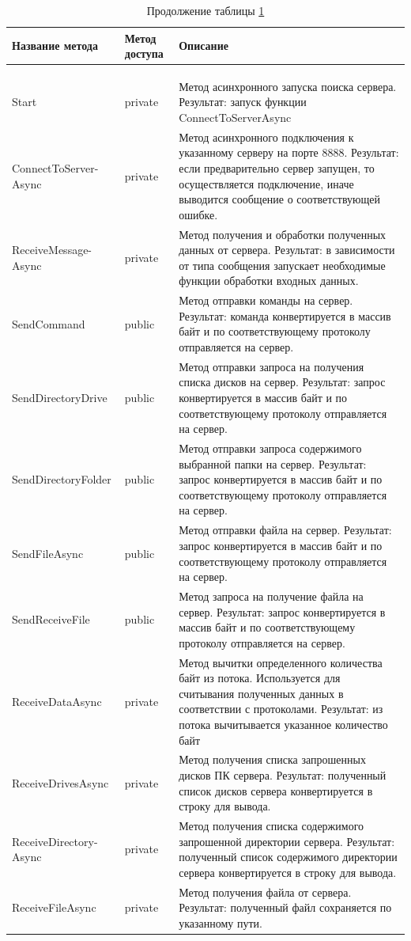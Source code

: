\begin{longtable}[l]{|p{4.25cm}|p{2.35cm}|p{8.1cm}|}
	\caption{Описание методов класса TcpSocket\label{class:tableTcp}}\\
	\hline \centrow Название метода & \centrow Метод
	доступа & \centrow Описание \\
	\hline \centrow 1 & \centrow 2 & \centrow 3\\
	\endfirsthead
	\caption*{Продолжение таблицы \ref{class:tableTcp}}\\
	\hline \centrow 1 & \centrow 2 & \centrow 3\\
	\finishhead
	\hline Start & private & Метод асинхронного запуска поиска сервера.
	Результат: запуск функции  ConnectToServerAsync \\
	\hline ConnectToServer-
	Async & private & Метод асинхронного подключения к указанному серверу на порте 8888.
	Результат: если предварительно сервер запущен, то осуществляется подключение, иначе выводится сообщение о соответствующей ошибке.\\
	\hline ReceiveMessage-
	Async & private & Метод получения и обработки полученных данных от сервера.
	Результат: в зависимости от типа сообщения запускает необходимые функции обработки входных данных.\\
	\hline SendCommand & public & Метод отправки команды на сервер.
	Результат: команда конвертируется в массив байт и по соответствующему протоколу отправляется на сервер.\\
	\hline SendDirectoryDrive & public & Метод отправки запроса на получения списка дисков на сервер.
	Результат: запрос конвертируется в массив байт и по соответствующему протоколу отправляется на сервер.\\
	\hline SendDirectoryFolder & public & Метод отправки запроса содержимого выбранной папки на сервер.
	Результат: запрос конвертируется в массив байт и по соответствующему протоколу отправляется на сервер.\\
	\hline SendFileAsync & public &  Метод отправки файла на сервер.
	Результат: запрос конвертируется в массив байт и по соответствующему протоколу отправляется на сервер.\\
	\hline SendReceiveFile & public & Метод запроса на получение файла на сервер.
	Результат: запрос конвертируется в массив байт и по соответствующему протоколу отправляется на сервер.\\
	\hline ReceiveDataAsync & private & Метод вычитки определенного количества байт из потока. Используется для считывания полученных данных в соответствии с протоколами.
	Результат: из потока вычитывается указанное количество байт\\
	\hline ReceiveDrivesAsync & private & Метод получения списка запрошенных дисков ПК сервера.
	Результат: полученный список дисков сервера конвертируется в строку для вывода.\\
	\hline ReceiveDirectory-
	Async & private & Метод получения списка содержимого запрошенной директории сервера.
	Результат: полученный список содержимого директории сервера конвертируется в строку для вывода.\\
	\hline ReceiveFileAsync & private & Метод получения файла от сервера.
	Результат: полученный файл сохраняется по указанному пути. 
\end{longtable}
